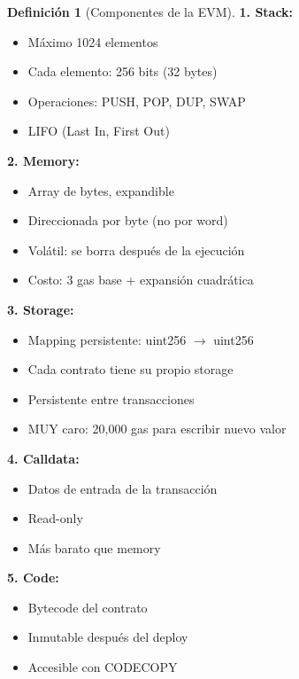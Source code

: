 \documentclass[11pt,a4paper,twoside,openright]{book}
\theoremstyle{definition}
\newtheorem{definition}{Definición}[chapter]
\theoremstyle{plain}
\theoremstyle{remark}
\begin{document}
\begin{definition}[Componentes de la EVM]
\textbf{1. Stack:}
\begin{itemize}
    \item Máximo 1024 elementos
    \item Cada elemento: 256 bits (32 bytes)
    \item Operaciones: PUSH, POP, DUP, SWAP
    \item LIFO (Last In, First Out)
\end{itemize}

\textbf{2. Memory:}
\begin{itemize}
    \item Array de bytes, expandible
    \item Direccionada por byte (no por word)
    \item Volátil: se borra después de la ejecución
    \item Costo: 3 gas base + expansión cuadrática
\end{itemize}

\textbf{3. Storage:}
\begin{itemize}
    \item Mapping persistente: uint256 $\to$ uint256
    \item Cada contrato tiene su propio storage
    \item Persistente entre transacciones
    \item MUY caro: 20,000 gas para escribir nuevo valor
\end{itemize}

\textbf{4. Calldata:}
\begin{itemize}
    \item Datos de entrada de la transacción
    \item Read-only
    \item Más barato que memory
\end{itemize}

\textbf{5. Code:}
\begin{itemize}
    \item Bytecode del contrato
    \item Inmutable después del deploy
    \item Accesible con CODECOPY
\end{itemize}
\end{definition}
\end{document}
